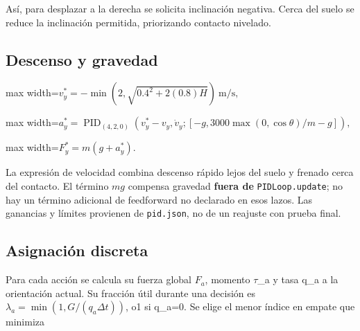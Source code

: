 \documentclass[12pt,a4paper]{article}
\begin{document}
Así,\allowbreak{} para desplazar a la derecha se solicita inclinación negativa. Cerca del suelo se reduce la inclinación permitida,\allowbreak{} priorizando contacto nivelado.



\subsection{Descenso y gravedad}

\begin{center}\begin{adjustbox}{max width=\linewidth}$\displaystyle v_y^*=-\min\left(2,\sqrt{0.4^2+2(0.8)H}\right)\ \mathrm{m/s},$\end{adjustbox}\end{center}


\begin{center}\begin{adjustbox}{max width=\linewidth}$\displaystyle a_y^*=\operatorname{PID}_{(4,2,0)}\left(v_y^*-v_y,\dot v_y;
[-g,3000\max(0,\cos\theta)/m-g]\right),$\end{adjustbox}\end{center}


\begin{center}\begin{adjustbox}{max width=\linewidth}$\displaystyle F_y^*=m(g+a_y^*).$\end{adjustbox}\end{center}



La expresión de velocidad combina descenso rápido lejos del suelo y frenado cerca del contacto. El término $mg$ compensa gravedad \textbf{fuera de} \nolinkurl{PIDLoop.update}; no hay un término adicional de feedforward no declarado en esos lazos. Las ganancias y límites provienen de \textcolor{Accent}{\nolinkurl{pid.json}},\allowbreak{} no de un reajuste con prueba final.



\subsection{Asignación discreta}
Para cada acción se calcula su fuerza global $F_a$,\allowbreak{} momento \ensuremath{\tau}\_a y tasa q\_a a la orientación actual. Su fracción útil durante una decisión es $\lambda_a=\min(1,G/(q_a\Delta t))$,\allowbreak{} o1 si q\_a=0. Se elige el menor índice en empate que minimiza
\end{document}
